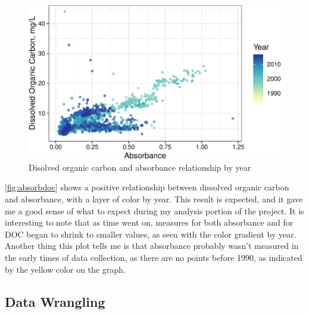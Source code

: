 \documentclass[12pt,]{article}
\newenvironment{Shaded}{\begin{snugshade}}{\end{snugshade}}
\newcommand{\KeywordTok}[1]{\textcolor[rgb]{0.13,0.29,0.53}{\textbf{#1}}}
\newcommand{\StringTok}[1]{\textcolor[rgb]{0.31,0.60,0.02}{#1}}
\newcommand{\OperatorTok}[1]{\textcolor[rgb]{0.81,0.36,0.00}{\textbf{#1}}}
\newcommand{\NormalTok}[1]{#1}
\begin{document}
\begin{figure}
\centering
\includegraphics{Bash_ENV872_Project_files/figure-latex/absorbdoc-1.pdf}
\caption{\label{fig:absorbdoc} Disolved organic carbon and absorbance
relationship by year}
\end{figure}

\autoref{fig:absorbdoc} shows a positive relationship between dissolved
organic carbon and absorbance, with a layer of color by year. This
result is expected, and it gave me a good sense of what to expect during
my analysis portion of the project. It is interesting to note that as
time went on, measures for both absorbance and for DOC began to shrink
to smaller values, as seen with the color gradient by year. Another
thing this plot tells me is that absorbance probably wasn't measured in
the early times of data collection, as there are no points before 1990,
as indicated by the yellow color on the graph.

\subsection{Data Wrangling}\label{data-wrangling}

\begin{Shaded}
\end{Shaded}
\end{document}
